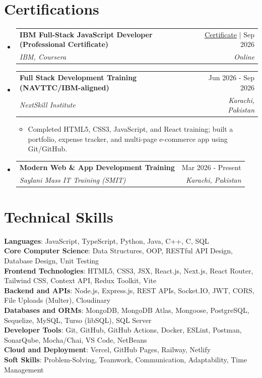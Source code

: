 \documentclass[letterpaper,10pt]{article}
\makeatletter
\let\oldhref\href
\renewcommand{\href}[2]{\oldhref{#1}{\underline{#2}}}
\newcommand{\resumeItem}[1]{
  \item\small{#1}
}
\newcommand{\resumeSubheading}[4]{
  \vspace{0pt}\item
    \begin{tabular*}{0.98\textwidth}[t]{l@{\extracolsep{\fill}}r}
      \textbf{#1} & #2 \\
      \textit{\small#3} & \textit{\small #4} \\
    \end{tabular*}\vspace{-2pt}
}
\newcommand{\resumeSubHeadingListStart}{\begin{itemize}[leftmargin=0.15in, label={}, itemsep=3pt, topsep=3pt]}
\newcommand{\resumeSubHeadingListEnd}{\end{itemize}}
\newcommand{\resumeItemListStart}{\begin{itemize}[leftmargin=0.18in, label=-, itemsep=2pt, topsep=3pt]}
\newcommand{\resumeItemListEnd}{\end{itemize}\vspace{-1pt}}
\makeatother
\begin{document}
\section{Certifications}
  \resumeSubHeadingListStart
    \resumeSubheading
      {IBM Full-Stack JavaScript Developer (Professional Certificate)}{\href{https://coursera.org/verify/professional-cert/ACOM3SC87IX4}{Certificate} $|$ Sep 2026}
      {IBM, Coursera}{Online}
    \resumeSubheading
      {Full Stack Development Training (NAVTTC/IBM-aligned)}{Jun 2026 - Sep 2026}
      {NextSkill Institute}{Karachi, Pakistan}
      \resumeItemListStart
        \resumeItem{Completed HTML5, CSS3, JavaScript, and React training; built a portfolio, expense tracker, and multi-page e-commerce app using Git/GitHub.}
      \resumeItemListEnd
    \resumeSubheading
      {Modern Web \& App Development Training}{Mar 2026 - Present}
      {Saylani Mass IT Training (SMIT)}{Karachi, Pakistan}
  \resumeSubHeadingListEnd

\section{Technical Skills}
 \begin{itemize}[leftmargin=0.15in, label={}]
    \small{\item{
     \textbf{Languages}{: JavaScript, TypeScript, Python, Java, C++, C, SQL} \\
     \textbf{Core Computer Science}{: Data Structures, OOP, RESTful API Design, Database Design, Unit Testing} \\
     \textbf{Frontend Technologies}{: HTML5, CSS3, JSX, React.js, Next.js, React Router, Tailwind CSS, Context API, Redux Toolkit, Vite} \\
     \textbf{Backend and APIs}{: Node.js, Express.js, REST APIs, Socket.IO, JWT, CORS, File Uploads (Multer), Cloudinary} \\
     \textbf{Databases and ORMs}{: MongoDB, MongoDB Atlas, Mongoose, PostgreSQL, Sequelize, MySQL, Turso (libSQL), SQL Server} \\
     \textbf{Developer Tools}{: Git, GitHub, GitHub Actions, Docker, ESLint, Postman, SonarQube, Mocha/Chai, VS Code, NetBeans} \\
     \textbf{Cloud and Deployment}{: Vercel, GitHub Pages, Railway, Netlify} \\
     \textbf{Soft Skills}{: Problem-Solving, Teamwork, Communication, Adaptability, Time Management}
    }}
 \end{itemize}
\end{document}
